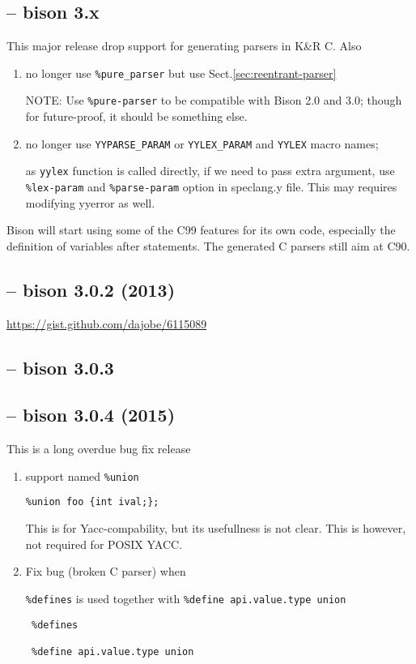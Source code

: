 \subsection{-- bison 3.x}

This major release  drop support for generating parsers in K\&R C. Also
\begin{enumerate}
  \item no longer use \verb!%pure_parser! but use Sect.\ref{sec:reentrant-parser}
  
 NOTE: Use \verb!%pure-parser! to be compatible with Bison 2.0 and 3.0; though for future-proof, it should be something else. 
  
  \item no longer use \verb!YYPARSE_PARAM! or \verb!YYLEX_PARAM! and \verb!YYLEX! macro names;
  
   as \verb!yylex! function is called directly, if we need to pass extra
   argument, use \verb!%lex-param! and \verb!%parse-param! option in speclang.y
   file. This may requires modifying yyerror as well.
   
\end{enumerate}

Bison will start using some of the C99 features for its own code, especially the
definition of variables after statements. The generated C parsers still aim at C90.
  

\subsection{-- bison 3.0.2 (2013)}

\url{https://gist.github.com/dajobe/6115089}

\subsection{-- bison 3.0.3 }

\subsection{-- bison 3.0.4 (2015)}

This is a long overdue bug fix release
\begin{enumerate}
  \item support named \verb!%union!

\begin{verbatim}
%union foo {int ival;};

\end{verbatim}
This is for Yacc-compability, but its usefullness is not clear. This is however, not required for POSIX YACC.

  \item Fix bug (broken C parser) when
  
 \verb!%defines! is used together with \verb!%define api.value.type union!
 
 \begin{verbatim}
 %defines
 
 %define api.value.type union
 \end{verbatim}
 
\end{enumerate}

